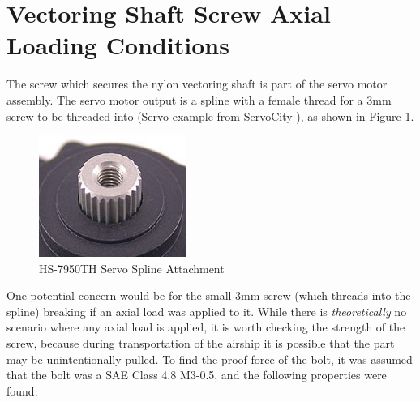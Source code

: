 \documentclass[../main.tex]{subfiles}
\begin{document}
\section{Vectoring Shaft Screw Axial Loading Conditions} \label{axialShaft}
The screw which secures the nylon vectoring shaft is part of the servo motor assembly. The servo motor output is a spline with a female thread for a 3mm screw to be threaded into (Servo example from ServoCity \cite{SPLINE}), as shown in Figure \ref{fig:servoSpline}.

\begin{figure}[H]
	\centering
	\includegraphics[width=.5\linewidth]{img/servo/spline.PNG}
	\caption{HS-7950TH Servo Spline Attachment \cite{SPLINE}}
	\label{fig:servoSpline}
\end{figure}

One potential concern would be for the small 3mm screw (which threads into the spline) breaking if an axial load was applied to it. While there is \textit{theoretically} no scenario where any axial load is applied, it is worth checking the strength of the screw, because during transportation of the airship it is possible that the part may be unintentionally pulled. To find the proof force of the bolt, it was assumed that the bolt was a SAE Class 4.8 M3-0.5, and the following properties were found:
\end{document}
